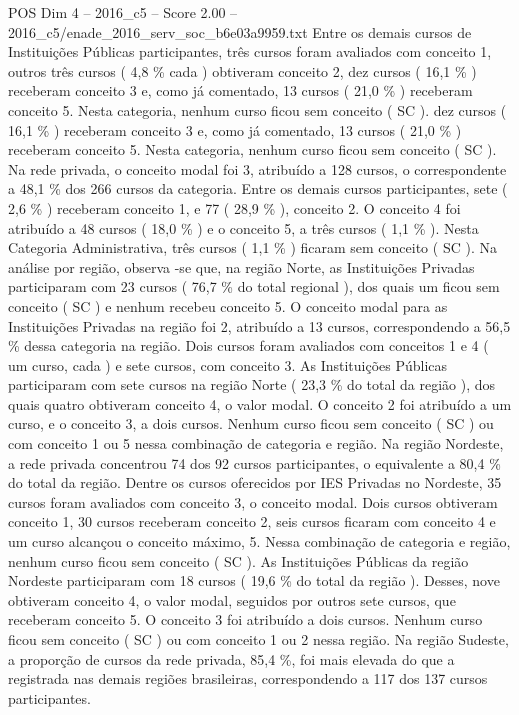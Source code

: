 \begin{textsample}{POS Dim 4 – 2016\_c5 – Score 2.00 – 2016\_c5/enade\_2016\_serv\_soc\_b6e03a9959.txt}
Entre os demais cursos de Instituições Públicas participantes, três cursos foram avaliados com conceito 1, outros três cursos ( 4,8 \% cada ) obtiveram conceito 2, dez cursos ( 16,1 \% ) receberam conceito 3 e, como já comentado, 13 cursos ( 21,0 \% ) receberam conceito 5.
Nesta categoria, nenhum curso ficou sem conceito ( SC ). dez cursos ( 16,1 \% ) receberam conceito 3 e, como já comentado, 13 cursos ( 21,0 \% ) receberam conceito 5.
Nesta categoria, nenhum curso ficou sem conceito ( SC ).
Na rede privada, o conceito modal foi 3, atribuído a 128 cursos, o correspondente a 48,1 \% dos 266 cursos da categoria.
Entre os demais cursos participantes, sete ( 2,6 \% ) receberam conceito 1, e 77 ( 28,9 \% ), conceito 2.
O conceito 4 foi atribuído a 48 cursos ( 18,0 \% ) e o conceito 5, a três cursos ( 1,1 \% ).
Nesta Categoria Administrativa, três cursos ( 1,1 \% ) ficaram sem conceito ( SC ).
Na análise por região, observa -se que, na região Norte, as Instituições Privadas participaram com 23 cursos ( 76,7 \% do total regional ), dos quais um ficou sem conceito ( SC ) e nenhum recebeu conceito 5.
O conceito modal para as Instituições Privadas na região foi 2, atribuído a 13 cursos, correspondendo a 56,5 \% dessa categoria na região.
Dois cursos foram avaliados com conceitos 1 e 4 ( um curso, cada ) e sete cursos, com conceito 3.
As Instituições Públicas participaram com sete cursos na região Norte ( 23,3 \% do total da região ), dos quais quatro obtiveram conceito 4, o valor modal.
O conceito 2 foi atribuído a um curso, e o conceito 3, a dois cursos.
Nenhum curso ficou sem conceito ( SC ) ou com conceito 1 ou 5 nessa combinação de categoria e região.
Na região Nordeste, a rede privada concentrou 74 dos 92 cursos participantes, o equivalente a 80,4 \% do total da região.
Dentre os cursos oferecidos por IES Privadas no Nordeste, 35 cursos foram avaliados com conceito 3, o conceito modal.
Dois cursos obtiveram conceito 1, 30 cursos receberam conceito 2, seis cursos ficaram com conceito 4 e um curso alcançou o conceito máximo, 5.
Nessa combinação de categoria e região, nenhum curso ficou sem conceito ( SC ).
As Instituições Públicas da região Nordeste participaram com 18 cursos ( 19,6 \% do total da região ).
Desses, nove obtiveram conceito 4, o valor modal, seguidos por outros sete cursos, que receberam conceito 5.
O conceito 3 foi atribuído a dois cursos.
Nenhum curso ficou sem conceito ( SC ) ou com conceito 1 ou 2 nessa região.
Na região Sudeste, a proporção de cursos da rede privada, 85,4 \%, foi mais elevada do que a registrada nas demais regiões brasileiras, correspondendo a 117 dos 137 cursos participantes.

\end{textsample}
